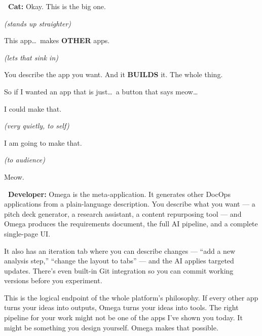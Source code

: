 \documentclass[12pt, letterpaper]{article}
\newcommand{\dev}{\textbf{\color{cogblue}\faIcon{laptop-code}\ Developer:}}
\newcommand{\cat}{\textbf{\color{catpink}\faIcon{cat}\ Cat:}}
\begin{document}
  \begin{catbox}
    \cat{} \large Okay. This is the big one.

    \medskip
    {\large\textit{(stands up straighter)}}

    \medskip
    {\large This app\ldots\ makes \textbf{OTHER} apps.}

    \medskip
    {\large\textit{(lets that sink in)}}

    \medskip
    {\large You describe the app you want. And it \textbf{BUILDS} it. The whole
    thing.}

    \medskip
    {\large So if I wanted an app that is just\ldots\ a button that says
    meow\ldots}

    \medskip
    {\large I could make that.}

    \medskip
    {\large\textit{(very quietly, to self)}}

    \medskip
    {\large I am going to make that.}

    \medskip
    {\large\textit{(to audience)}}

    \medskip
    {\large Meow.}
  \end{catbox}

  \begin{developerbox}
    \dev{} Omega is the meta-application. It generates other DocOps applications
    from a plain-language description. You describe what you want — a pitch deck
    generator, a research assistant, a content repurposing tool — and Omega
    produces the requirements document, the full AI pipeline, and a complete
    single-page UI.

    \medskip
    It also has an iteration tab where you can describe changes — ``add a new
    analysis step,'' ``change the layout to tabs'' — and the AI applies targeted
    updates. There's even built-in Git integration so you can commit working
    versions before you experiment.

    \medskip
    This is the logical endpoint of the whole platform's philosophy. If every other
    app turns your ideas into outputs, Omega turns your ideas into tools. The right
    pipeline for your work might not be one of the apps I've shown you today. It
    might be something you design yourself. Omega makes that possible.
  \end{developerbox}

  \newpage

\end{document}
